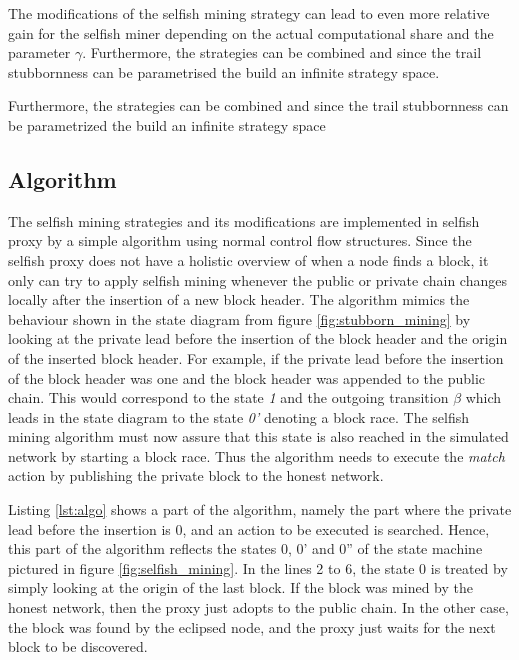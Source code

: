 The modifications of the selfish mining strategy can lead to even more relative gain for the selfish miner depending on the actual computational share and the parameter $\gamma$.
Furthermore, the strategies can be combined and since the trail stubbornness can be parametrised the build an infinite strategy space.

Furthermore, the strategies can be combined and since the trail stubbornness can be parametrized the build an infinite strategy space

\subsection{Algorithm}

The selfish mining strategies and its modifications are implemented in selfish proxy by a simple algorithm using normal control flow structures.
Since the selfish proxy does not have a holistic overview of when a node finds a block, it only can try to apply selfish mining whenever the public or private chain changes locally after the insertion of a new block header.
The algorithm mimics the behaviour shown in the state diagram from figure \ref{fig:stubborn_mining} by looking at the private lead before the insertion of the block header and the origin of the inserted block header.
For example, if the private lead before the insertion of the block header was one and the block header was appended to the public chain.
This would correspond to the state \textit{1} and the outgoing transition $\beta$ which leads in the state diagram to the state \textit{0'} denoting a block race.
The selfish mining algorithm must now assure that this state is also reached in the simulated network by starting a block race.
Thus the algorithm needs to execute the \textit{match} action by publishing the private block to the honest network.

Listing \ref{lst:algo} shows a part of the algorithm, namely the part where the private lead before the insertion is 0, and an action to be executed is searched.
Hence, this part of the algorithm reflects the states 0, 0' and 0'' of the state machine pictured in figure \ref{fig:selfish_mining}.
In the lines 2 to 6, the state 0 is treated by simply looking at the origin of the last block.
If the block was mined by the honest network, then the proxy just adopts to the public chain.
In the other case, the block was found by the eclipsed node, and the proxy just waits for the next block to be discovered.

